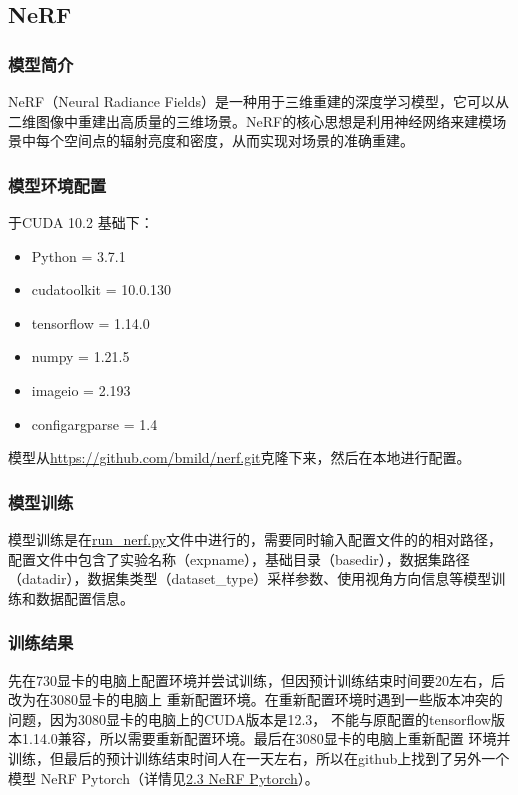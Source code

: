 \documentclass{nwputhesis}
\begin{document}
\subsection{NeRF}
\subsubsection{模型简介}
NeRF（Neural Radiance Fields）是一种用于三维重建的深度学习模型，它可以从二维图像中重建出高质量的三维场景。NeRF的核心思想是利用神经网络来建模场景中每个空间点的辐射亮度和密度，从而实现对场景的准确重建。
\subsubsection{模型环境配置}
\noindent 于CUDA 10.2 基础下：
\begin{itemize}
    \item Python = 3.7.1
    \item cudatoolkit = 10.0.130
    \item tensorflow = 1.14.0
    \item numpy = 1.21.5
    \item imageio = 2.193
    \item configargparse = 1.4
\end{itemize}
模型从\underline{https://github.com/bmild/nerf.git}克隆下来，然后在本地进行配置。

\subsubsection{模型训练}
\indent 模型训练是在\underline{run\_nerf.py}文件中进行的，需要同时输入配置文件的的相对路径，配置文件中包含了实验名称（expname），基础目录（basedir），数据集路径（datadir），数据集类型（dataset\_type）采样参数、使用视角方向信息等模型训练和数据配置信息。

\subsubsection{训练结果}
先在730显卡的电脑上配置环境并尝试训练，但因预计训练结束时间要20左右，后改为在3080显卡的电脑上
重新配置环境。在重新配置环境时遇到一些版本冲突的问题，因为3080显卡的电脑上的CUDA版本是12.3，
不能与原配置的tensorflow版本1.14.0兼容，所以需要重新配置环境。最后在3080显卡的电脑上重新配置
环境并训练，但最后的预计训练结束时间人在一天左右，所以在github上找到了另外一个模型
NeRF Pytorch（详情见\hyperlink{section 2.3}{2.3 NeRF Pytorch}）。
\makespace
\end{document}
